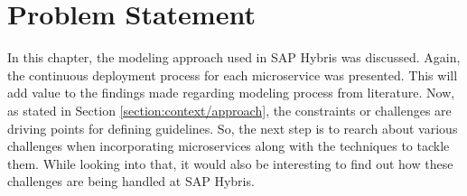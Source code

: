 \section{Problem Statement}\label{section: hybris_architecture/problem_statement}
In this chapter, the modeling approach used in SAP Hybris was discussed. Again, the continuous deployment process for each microservice was presented. This will add value to the findings made regarding modeling process from literature. Now, as stated in Section \ref{section:context/approach}, the constraints or challenges are driving points for defining guidelines. So, the next step is to rearch about various challenges when incorporating microservices along with the techniques to tackle them. While looking into that, it would also be interesting to find out how these challenges are being handled at SAP Hybris.












